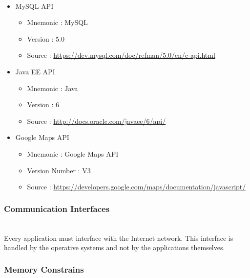 \paragraph{} 

\begin{itemize}
	\item MySQL API
	\begin{itemize}
		\item Mnemonic : MySQL
		\item Version : 5.0
		\item Source : \url{https://dev.mysql.com/doc/refman/5.0/en/c-api.html}
	\end{itemize}

	\item Java EE API
	\begin{itemize}
		\item Mnemonic : Java
		\item Version : 6
		\item Source : \url{http://docs.oracle.com/javaee/6/api/}
	\end{itemize}

	\item Google Maps API
	\begin{itemize}
		\item Mnemonic : Google Maps API
		\item Version Number : V3
		\item Source : \url{https://developers.google.com/maps/documentation/javascript/}
	\end{itemize}

\end{itemize}

\subsubsection{Communication Interfaces} 
\label{ssub:communication_interfaces}
\paragraph{}\mbox{} \\
Every application must interface with the Internet network. This interface is handled by the operative systems and not by the applications themselves.

\subsubsection{Memory Constrains} 

